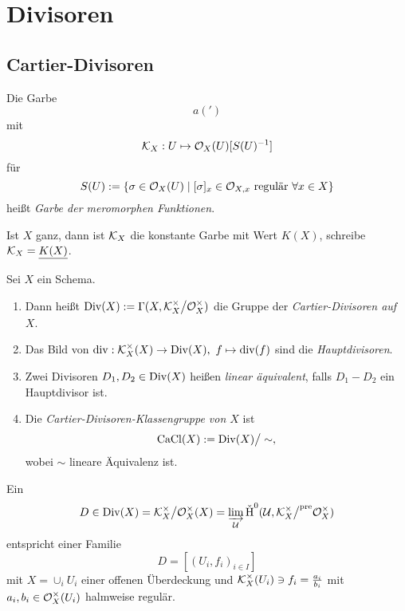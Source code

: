 \section{Divisoren}

\subsection{Cartier-Divisoren}
\newcommand{\KX}{\cal K_X}

\begin{definition}
    Die Garbe
    \[ a(')\]
    mit 
    \[
        \KX: U \mapsto \O_X(U)[S(U)\inv]
    \]
    für 
    \[S(U) := \{\sigma \in \mathcal{O}_X(U) \mid [\sigma]_x \in \mathcal{O}_{X,x}
        \text{ regulär }\forall x\in X\}\]
    heißt \emph{Garbe der meromorphen Funktionen}.
\end{definition}

\begin{bemerkung}
    Ist $X$ ganz, dann ist $\KX$ die konstante Garbe mit Wert $K(X)$, 
    schreibe $\KX = \underline{K(X)}$.
\end{bemerkung}


\begin{definition}
    Sei $X$ ein Schema.
    \begin{enumerate}[label=(\roman*)]
      \item Dann heißt $\Div(X) := \Gamma(X, \KX^\times \big/ \O_X^\times)$
        die Gruppe der \emph{Cartier-Divisoren auf $X$}.
      \item Das Bild von $\div: \KX^\times(X) \to \Div(X),\ f \mapsto \div(f)$
        sind die \emph{Hauptdivisoren}.
      \item Zwei Divisoren $D_1,D_2 \in \operatorname{Div}(X)$ heißen 
        \emph{linear äquivalent}, falls $D_1 - D_2$ ein Hauptdivisor ist.
      \item Die \emph{Cartier-Divisoren-Klassengruppe von $X$} ist
        \[ \operatorname{CaCl}(X) := \operatorname{Div}(X) \big/ \sim,\]
         wobei $\sim$ lineare Äquivalenz ist.
    \end{enumerate}
\end{definition}

\begin{bemerkung}
    Ein 
    \[
        D\in \Div(X) = \KX^\times \big/ \O_X^\times (X) = 
        \varinjlim_{\U} \Hv^0(\U, \KX^\times \big/^\text{pre} \O_X^\times)
    \]
    entspricht einer Familie 
    \[ D= [(U_i,f_i)_{i\in I}]\] mit
    $X = \cup_i U_i$ einer offenen Überdeckung und 
    $\KX^\times(U_i) \ni f_i = \tfrac{a_i}{b_i}$ mit 
    $a_i,b_i \in \mathcal{O}_X^\times (U_i)$ halmweise regulär.
\end{bemerkung}

